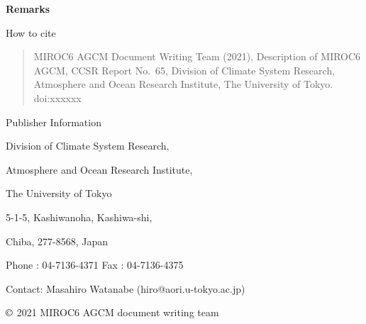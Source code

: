 \textbf{Remarks}

\hfill\break
\hfill\break
\hfill\break

How to cite

\begin{quote}
MIROC6 AGCM Document Writing Team (2021), Description of MIROC6 AGCM, CCSR Report No.~65, Division of Climate System Research, Atmosphere and Ocean Research Institute, The University of Tokyo.
doi:xxxxxx
\end{quote}

\hfill\break
\hfill\break
\hfill\break

Publisher Information

Division of Climate System Research,

Atmosphere and Ocean Research Institute,

The University of Tokyo

5-1-5, Kashiwanoha, Kashiwa-shi,

Chiba, 277-8568, Japan

Phone : 04-7136-4371 Fax : 04-7136-4375

Contact: Masahiro Watanabe (hiro@aori.u-tokyo.ac.jp)

\hfill\break
\hfill\break
\hfill\break
\hfill\break

\(\copyright\) 2021 MIROC6 AGCM document writing team
